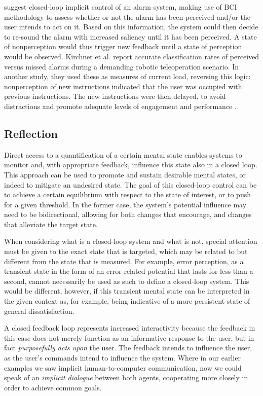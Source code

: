  suggest closed-loop implicit control of an alarm system, making use of BCI methodology to assess whether or not the alarm has been perceived and/or the user intends to act on it. Based on this information, the system could then decide to re-sound the alarm with increased saliency until it has been perceived. A state of nonperception would thus trigger new feedback until a state of perception would be observed. Kirchner et al. report accurate classification rates of perceived versus missed alarms during a demanding robotic teleoperation scenario. In another study, they used these as measures of current load, reversing this logic: nonperception of new instructions indicated that the user was occupied with previous instructions. The new instructions were then delayed, to avoid distractions and promote adequate levels of engagement and performance \cite{kirchner2016multirobotcontrol}.


\subsection{Reflection}

Direct access to a quantification of a certain mental state enables systems to monitor and, with appropriate feedback, influence this state also in a closed loop. This approach can be used to promote and sustain desirable mental states, or indeed to mitigate an undesired state. The goal of this closed-loop control can be to achieve a certain equilibrium with respect to the state of interest, or to push for a given threshold. In the former case, the system's potential influence may need to be bidirectional, allowing for both changes that encourage, and changes that alleviate the target state. 

When considering what is a closed-loop system and what is not, special attention must be given to the exact state that is targeted, which may be related to but different from the state that is measured. For example, error perception, as a transient state in the form of an error-related potential that lasts for less than a second, cannot necessarily be used as such to define a closed-loop system. This would be different, however, if this transient mental state can be interpreted in the given context as, for example, being indicative of a more persistent state of general dissatisfaction.  

A closed feedback loop represents increased interactivity because the feedback in this case does not merely function as an informative response to the user, but in fact \emph{purposefully acts upon} the user. The feedback intends to influence the user, as the user's commands intend to influence the system. Where in our earlier examples we saw implicit human-to-computer communication, now we could speak of an \emph{implicit dialogue} between both agents, cooperating more closely in order to achieve common goals.

